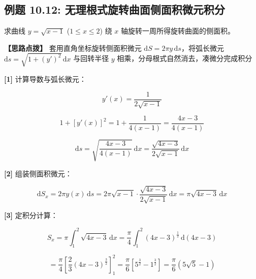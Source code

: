 \documentclass[11pt,a4paper,UTF8]{ctexart}
\begin{document}
\subsection{例题 10.12: 无理根式旋转曲面侧面积微元积分}

求曲线 $y = \sqrt{x-1}$ ($1 \leqslant x \leqslant 2$) 绕 $x$ 轴旋转一周所得旋转曲面的侧面积。

\textbf{\color{DeepPurple}【思路点拨】} 套用直角坐标旋转侧面积微元 $\mathrm{d}S = 2\pi y\,\mathrm{d}s$，将弧长微元 $\mathrm{d}s = \sqrt{1+(y')^2}\,\mathrm{d}x$ 与回转半径 $y$ 相乘，分母根式自然消去，凑微分完成积分


\begin{solbox}[分步推导与答题规范]
\textbf{[1]} 计算导数与弧长微元：


\begin{equation*}
y'(x) = \frac{1}{2\sqrt{x-1}}
\end{equation*}



\begin{equation*}
1 + [y'(x)]^2 = 1 + \frac{1}{4(x-1)} = \frac{4x-3}{4(x-1)}
\end{equation*}



\begin{equation*}
\mathrm{d}s = \sqrt{\frac{4x-3}{4(x-1)}}\,\mathrm{d}x = \frac{\sqrt{4x-3}}{2\sqrt{x-1}}\,\mathrm{d}x
\end{equation*}


\textbf{[2]} 组装侧面积微元：


\begin{equation*}
\mathrm{d}S_x = 2\pi y(x)\,\mathrm{d}s = 2\pi \sqrt{x-1} \cdot \frac{\sqrt{4x-3}}{2\sqrt{x-1}}\,\mathrm{d}x = \pi \sqrt{4x-3}\,\mathrm{d}x
\end{equation*}


\textbf{[3]} 定积分计算：


\begin{equation*}
S_x = \pi \int_1^2 \sqrt{4x-3}\,\mathrm{d}x = \frac{\pi}{4}\int_1^2 (4x-3)^{\frac{1}{2}}\,\mathrm{d}(4x-3)
\end{equation*}



\begin{equation*}
= \frac{\pi}{4} \left[\frac{2}{3}(4x-3)^{\frac{3}{2}}\right]_1^2 = \frac{\pi}{6} [5^{\frac{3}{2}} - 1^{\frac{3}{2}}] = \frac{\pi}{6}(5\sqrt{5}-1)
\end{equation*}

\end{solbox}
\end{document}

